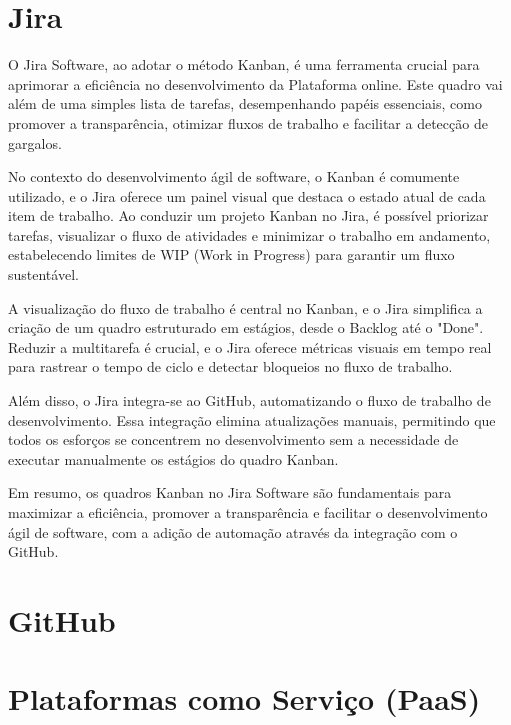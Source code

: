 \section{%
Jira}
O Jira Software, ao adotar o método Kanban, é uma ferramenta crucial para aprimorar a eficiência no desenvolvimento da Plataforma online. Este quadro vai além de uma simples lista de tarefas, desempenhando papéis essenciais, como promover a transparência, otimizar fluxos de trabalho e facilitar a detecção de gargalos.

No contexto do desenvolvimento ágil de software, o Kanban é comumente utilizado, e o Jira oferece um painel visual que destaca o estado atual de cada item de trabalho. Ao conduzir um projeto Kanban no Jira, é possível priorizar tarefas, visualizar o fluxo de atividades e minimizar o trabalho em andamento, estabelecendo limites de WIP (Work in Progress) para garantir um fluxo sustentável.

A visualização do fluxo de trabalho é central no Kanban, e o Jira simplifica a criação de um quadro estruturado em estágios, desde o Backlog até o "Done". Reduzir a multitarefa é crucial, e o Jira oferece métricas visuais em tempo real para rastrear o tempo de ciclo e detectar bloqueios no fluxo de trabalho.

Além disso, o Jira integra-se ao GitHub, automatizando o fluxo de trabalho de desenvolvimento. Essa integração elimina atualizações manuais, permitindo que todos os esforços se concentrem no desenvolvimento sem a necessidade de executar manualmente os estágios do quadro Kanban.

Em resumo, os quadros Kanban no Jira Software são fundamentais para maximizar a eficiência, promover a transparência e facilitar o desenvolvimento ágil de software, com a adição de automação através da integração com o GitHub.

\section{%
GitHub}
\section{%
Plataformas como Serviço (PaaS)}
